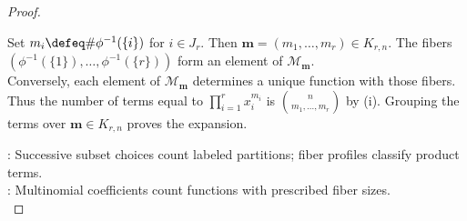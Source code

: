 \begin{proposition}
\begin{proof}
\begin{enumerate}[label=(\roman*)]
Set $m_i\defeq\#\phi^{-1}(\{i\})$ for $i\in J_r$. Then $\mathbf{m}=(m_1,\ldots,m_r)\in K_{r,n}$. The fibers $(\phi^{-1}(\{1\}),\ldots,\phi^{-1}(\{r\}))$ form an element of $\mathcal{M}_{\mathbf{m}}$.\\
Conversely, each element of $\mathcal{M}_{\mathbf{m}}$ determines a unique function with those fibers.\\
Thus the number of terms equal to $\prod\limits_{i=1}^{r}x_i^{m_i}$ is $\binom{n}{m_1,\ldots,m_r}$ by (i). Grouping the terms over $\mathbf{m}\in K_{r,n}$ proves the expansion.
\end{enumerate}
: Successive subset choices count labeled partitions; fiber profiles classify product terms.\\
: Multinomial coefficients count functions with prescribed fiber sizes.\\
\end{proof}
\end{proposition}


